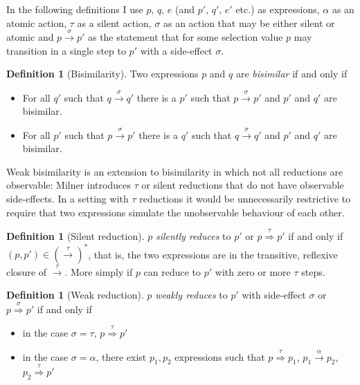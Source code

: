\documentclass[12pt,twoside,notitlepage]{report}
\theoremstyle{plain}%
\theoremstyle{definition}
\newtheorem{defn}[thm]{Definition}
\theoremstyle{remark}
\begin{document}
In the following definitions I use $ p,\, q,\, e $ (and $ p',\,q',\, e' $ etc.) as expressions, $ \alpha $ as an atomic action, $ \tau $ as a silent action, $ \sigma $ as an action that may be either silent or atomic and $ p \overset{\sigma}{\rightarrow} p' $ as the statement that for some selection value $ p $ may transition in a single step to $ p' $ with a side-effect $ \sigma $.

\begin{defn}[Bisimilarity]
Two expressions $ p $ and $ q $ are \textit{bisimilar} if and only if
\begin{itemize}
\item{For all $ q' $ such that $ q \overset{\sigma}{\rightarrow} q' $ there is a $ p' $ such that $ p \overset{\sigma}{\rightarrow} p' $ and $ p' $ and $ q' $ are bisimilar. }
\item{For all $ p' $ such that $ p \overset{\sigma}{\rightarrow} p' $ there is a $ q' $ such that $ q \overset{\sigma}{\rightarrow} q' $ and $ p' $ and $ q' $ are bisimilar. }
\end{itemize}
\end{defn}

Weak bisimilarity is an extension to bisimilarity in which not all reductions are observable: Milner\cite{milner1982calculus} introduces $ \tau $ or silent reductions that do not have observable side-effects. In a setting with $ \tau $ reductions it would be unnecessarily restrictive to require that two expressions simulate the unobservable behaviour of each other. 

\begin{defn}[Silent reduction]
$ p $ \textit{silently reduces} to $ p' $ or $ p \overset{\tau}{\Rightarrow} p' $ if and only if $ (p, p') \in \left(\overset{\tau}{\rightarrow}\right)^* $, that is, the two expressions are in the transitive, reflexive closure of $ \overset{\tau}{\rightarrow} $. More simply if $ p $ can reduce to $ p' $ with zero or more $ \tau $ steps.
\end{defn}

\begin{defn}[Weak reduction]
$ p $ \textit{weakly reduces} to $ p' $ with side-effect $ \sigma $ or $ p \overset{\sigma}{\Rightarrow} p' $ if and only if 
\begin{itemize}
\item{in the case $ \sigma = \tau $, $ p \overset{\tau}{\Rightarrow} p' $}
\item{in the case $ \sigma = \alpha $, there exist $ p_1, p_2 $ expressions such that $ p \overset{\tau}{\Rightarrow} p_1 $, $ p_1 \overset{\alpha}{\rightarrow} p_2 $, $ p_2 \overset{\tau}{\Rightarrow} p' $}
\end{itemize}
\end{defn}
\end{document}
